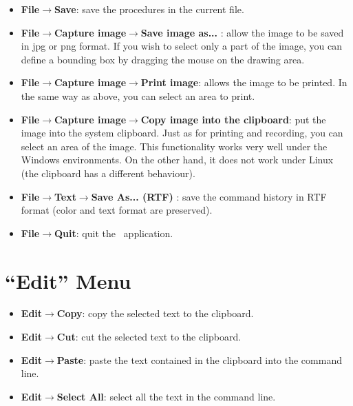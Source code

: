 \begin{itemize}
\begin{center}
\end{center}
\vspace{0.25cm}
\item \textbf{File$\to$Save}: save the procedures in the current file. \\
\item \textbf{File$\to$Capture image$\to$Save image as...} : allow the image to be
saved in jpg or png format. If you wish to select only a part
of the image, you can define a bounding box by dragging the mouse on the drawing area.
\vspace{0.25cm}
\item \textbf{File$\to$Capture image$\to$Print image}: allows the image to be printed.
In the same way as above, you can select an area to print. \\
\item \textbf{File$\to$Capture image$\to$Copy image into the clipboard}: put the image into the system clipboard. Just as for printing and recording, you can select an area of the image. This functionality works very well under the Windows environments. On the other hand, it does not work under Linux (the clipboard has a different behaviour).\\
\item \textbf{File$\to$Text$\to$Save As... (RTF) }: save the command history in RTF format (color and text format are preserved).\\
\item \textbf{File$\to$Quit}: quit the \xlogo\  application. 
\end{itemize}

\section{``Edit'' Menu}
\begin{itemize}
\item \textbf{Edit$\to$Copy}: copy the selected text to the clipboard. \\
\item \textbf{Edit$\to$Cut}: cut the selected text to the clipboard. \\
\item \textbf{Edit$\to$Paste}: paste the text contained in the clipboard into the command line.\\
\item \textbf{Edit$\to$Select All}: select all the text in the command line.
\end{itemize}


